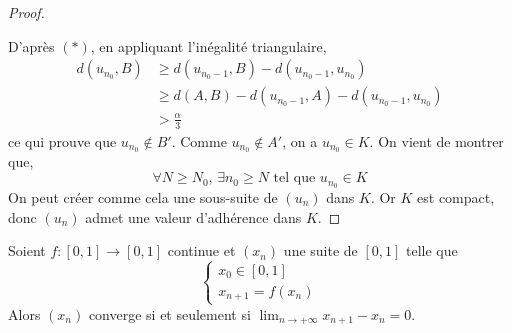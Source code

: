 \begin{proof}
\begin{center}
		\end{center}
		D'après $(*)$, en appliquant l'inégalité triangulaire,
		\begin{align*}
			d(u_{n_0}, B) & \geq d(u_{n_0 - 1}, B) - d(u_{n_0 - 1}, u_{n_0})           \\
			& \geq d(A, B) - d(u_{n_0 - 1}, A) - d(u_{n_0 - 1}, u_{n_0}) \\
			& > \frac{\alpha}{3}
		\end{align*}
		ce qui prouve que $u_{n_0} \notin B'$. Comme $u_{n_0} \notin A'$, on a $u_{n_0} \in K$. On vient de montrer que,
		\[ \forall N \geq N_0, \, \exists n_0 \geq N \text{ tel que } u_{n_0} \in K \]
		On peut créer comme cela une sous-suite de $(u_n)$ dans $K$. Or $K$ est compact, donc $(u_n)$ admet une valeur d'adhérence dans $K$.
	\end{proof}

	\begin{application}
		Soient $f : [0, 1] \rightarrow [0, 1]$ continue et $(x_n)$ une suite de $[0, 1]$ telle que
		\[ \begin{cases} x_0 \in [0, 1] \\ x_{n+1} = f(x_n) \end{cases} \]
		Alors $(x_n)$ converge si et seulement si $\lim_{n \rightarrow +\infty } x_{n+1} - x_n = 0$.
	\end{application}

